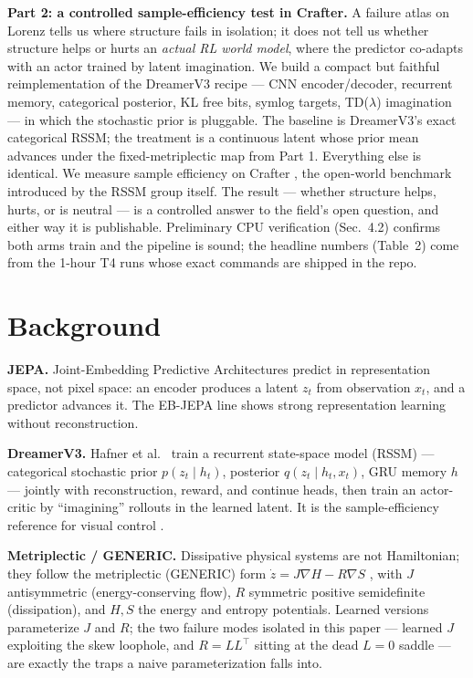 \documentclass[preprint,12pt]{article}
\begin{document}
\textbf{Part 2: a controlled sample-efficiency test in Crafter.} A failure
atlas on Lorenz tells us where structure fails in isolation; it does not
tell us whether structure helps or hurts an \emph{actual RL world model},
where the predictor co-adapts with an actor trained by latent imagination.
We build a compact but faithful reimplementation of the DreamerV3 recipe
--- CNN encoder/decoder, recurrent memory, categorical posterior, KL free
bits, symlog targets, TD($\lambda$) imagination --- in which the stochastic
prior is pluggable. The baseline is DreamerV3's exact categorical RSSM; the
treatment is a continuous latent whose prior mean advances under the
fixed-metriplectic map from Part 1. Everything else is identical. We
measure sample efficiency on Crafter \citep{hafner2021crafter}, the
open-world benchmark introduced by the RSSM group itself. The result ---
whether structure helps, hurts, or is neutral --- is a controlled answer to
the field's open question, and either way it is publishable. Preliminary
CPU verification (Sec.~4.2) confirms both arms train and the pipeline is
sound; the headline numbers (Table~2) come from the 1-hour T4 runs whose
exact commands are shipped in the repo.

\section{Background}

\textbf{JEPA.} Joint-Embedding Predictive Architectures \citep{lecun2022}
predict in representation space, not pixel space: an encoder produces a
latent $z_t$ from observation $x_t$, and a predictor advances it.
The EB-JEPA line \citep{assran2023,garrido2024} shows strong representation
learning without reconstruction.

\textbf{DreamerV3.} Hafner et al.\ \citep{hafner2023dreamerv3} train a
recurrent state-space model (RSSM) --- categorical stochastic prior
$p(z_t \mid h_t)$, posterior $q(z_t \mid h_t, x_t)$, GRU memory $h$ ---
jointly with reconstruction, reward, and continue heads, then train an
actor-critic by ``imagining'' rollouts in the learned latent. It is the
sample-efficiency reference for visual control \citep{hafner2021crafter}.

\textbf{Metriplectic / GENERIC.} Dissipative physical systems are not
Hamiltonian; they follow the metriplectic (GENERIC) form
$\dot{z} = J\nabla H - R\nabla S$ \citep{ottinger1997}, with $J$
antisymmetric (energy-conserving flow), $R$ symmetric positive
semidefinite (dissipation), and $H, S$ the energy and entropy potentials.
Learned versions \citep{zhang2021,hernandez2021,ha2023} parameterize
$J$ and $R$; the two failure modes isolated in this paper --- learned $J$
exploiting the skew loophole, and $R=LL^\top$ sitting at the dead $L=0$
saddle --- are exactly the traps a naive parameterization falls into.
\end{document}
